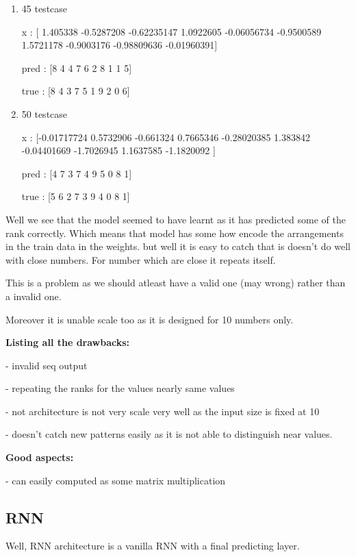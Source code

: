 \documentclass[journal,12pt,onecolumn]{IEEEtran}
\begin{document}
\begin{enumerate}
	x :  [ 0.8400531  -1.0256346   0.82031035  0.2576426   0.92889535 -0.8430145
 -0.76897925 -0.4580313  -1.3069686   1.555727  ]

pred :  [7 2 6 5 7 3 3 3 0 9]

true :  [7 1 6 5 8 2 3 4 0 9]

\item 45 testcase

	x :  [ 1.405338   -0.5287208  -0.62235147  1.0922605  -0.06056734 -0.9500589
  1.5721178  -0.9003176  -0.98809636 -0.01960391]

pred :  [8 4 4 7 6 2 8 1 1 5]

true :  [8 4 3 7 5 1 9 2 0 6]
\item 50 testcase

	x :  [-0.01717724  0.5732906  -0.661324    0.7665346  -0.28020385  1.383842
 -0.04401669 -1.7026945   1.1637585  -1.1820092 ]

pred :  [4 7 3 7 4 9 5 0 8 1]

true :  [5 6 2 7 3 9 4 0 8 1]
\end{enumerate}

Well we see that the model seemed to have learnt as it has predicted some of the rank correctly. Which means that model has some how encode the arrangements in the train data in the weights. but well it is easy to catch that is doesn't do well with close numbers. For number which are close it repeats itself.


This is a problem as we should atleast have a valid one (may wrong) rather than a invalid one.


Moreover it is unable scale too as it is designed for 10 numbers only.





\textbf{Listing all the drawbacks:}

- invalid seq output

- repeating the ranks for the values nearly same values

- not architecture is not very scale very well as the input size is fixed at 10

- doesn't catch new patterns easily as it is not able to distinguish near values.


\textbf{Good aspects:}

- can easily computed as some matrix multiplication

\subsection{RNN}
Well, RNN architecture is a vanilla RNN with a final predicting layer.
\end{document}
